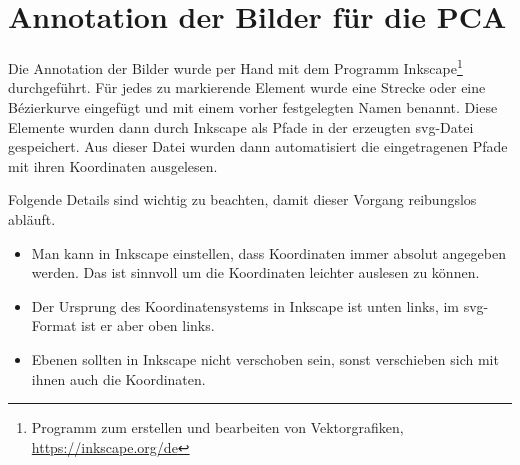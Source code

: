 \section{Annotation der Bilder für die PCA}

Die Annotation der Bilder wurde per Hand mit dem Programm Inkscape\footnote{Programm zum erstellen und bearbeiten von Vektorgrafiken, \url{https://inkscape.org/de}} durchgeführt. Für jedes zu markierende Element wurde eine Strecke oder eine Bézierkurve eingefügt und mit einem vorher festgelegten Namen benannt. Diese Elemente wurden dann durch Inkscape als Pfade in der erzeugten svg-Datei gespeichert. Aus dieser Datei wurden dann automatisiert die eingetragenen Pfade mit ihren Koordinaten ausgelesen.

Folgende Details sind wichtig zu beachten, damit dieser Vorgang reibungslos abläuft. 
\begin{itemize}
 \item Man kann in Inkscape einstellen, dass Koordinaten immer absolut angegeben werden. Das ist sinnvoll um die Koordinaten leichter auslesen zu können.
 \item Der Ursprung des Koordinatensystems in Inkscape ist unten links, im svg-Format ist er aber oben links.
 \item Ebenen sollten in Inkscape nicht verschoben sein, sonst verschieben sich mit ihnen auch die Koordinaten.  
\end{itemize}


